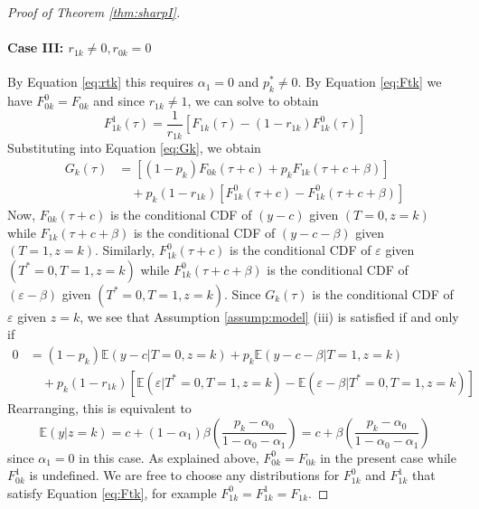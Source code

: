 \begin{proof}[Proof of Theorem \ref{thm:sharpI}]
\paragraph{Case III: $r_{1k}\neq 0, r_{0k} = 0$}
By Equation \ref{eq:rtk} this requires $\alpha_1 = 0$ and $p_k^* \neq 0$.
By Equation \ref{eq:Ftk} we have $F^0_{0k} = F_{0k}$ and since $r_{1k} \neq 1$, we can solve to obtain
\[
  F^1_{1k}(\tau) = \frac{1}{r_{1k}}\left[F_{1k}(\tau) - (1 - r_{1k})F^0_{1k}(\tau)\right]
\]
Substituting into Equation \ref{eq:Gk}, we obtain
\begin{align*}
  G_k(\tau) &= \left[ (1 - p_k)F_{0k}(\tau + c) + p_k F_{1k}(\tau + c + \beta) \right] \\ 
  &\quad + p_k(1 - r_{1k})\left[ F^0_{1k}(\tau + c) - F^0_{1k}(\tau + c + \beta) \right]
\end{align*}
Now, $F_{0k}(\tau + c)$ is the conditional CDF of $(y-c)$ given $(T=0,z=k)$ while $F_{1k}(\tau + c + \beta)$ is the conditional CDF of $(y-c-\beta)$ given $(T=1,z=k)$.
Similarly, $F^0_{1k}(\tau + c)$ is the conditional CDF of $\varepsilon$ given $(T^*=0,T = 1, z=k)$ while $F^0_{1k}(\tau + c + \beta)$ is the conditional CDF of $(\varepsilon - \beta)$ given $(T^*=0, T=1, z=k)$.
Since $G_k(\tau)$ is the conditional CDF of $\varepsilon$ given $z=k$, we see that Assumption \ref{assump:model} (iii) is satisfied if and only if
\begin{align*}
  0 &= (1 - p_k) \mathbb{E}(y-c|T=0,z=k) + p_k \mathbb{E}(y - c - \beta|T=1,z=k)\\
  &\quad + p_k(1 - r_{1k})\left[ \mathbb{E}(\varepsilon|T^*=0,T=1,z=k) - \mathbb{E}(\varepsilon - \beta|T^*=0,T=1,z=k) \right]
\end{align*}
Rearranging, this is equivalent to 
\[
  \mathbb{E}(y|z=k) = c + (1 - \alpha_1) \beta\left( \frac{p_k - \alpha_0}{1 - \alpha_0 - \alpha_1} \right) = c + \beta\left( \frac{p_k - \alpha_0}{1 - \alpha_0 - \alpha_1} \right)
\]
since $\alpha_1 = 0$ in this case.
As explained above, $F^0_{0k} = F_{0k}$ in the present case while $F^1_{0k}$ is undefined. 
We are free to choose any distributions for $F^{0}_{1k}$ and $F^{1}_{1k}$ that satisfy Equation \ref{eq:Ftk}, for example $F^{0}_{1k} = F^{1}_{1k} = F_{1k}$.


\end{proof}
